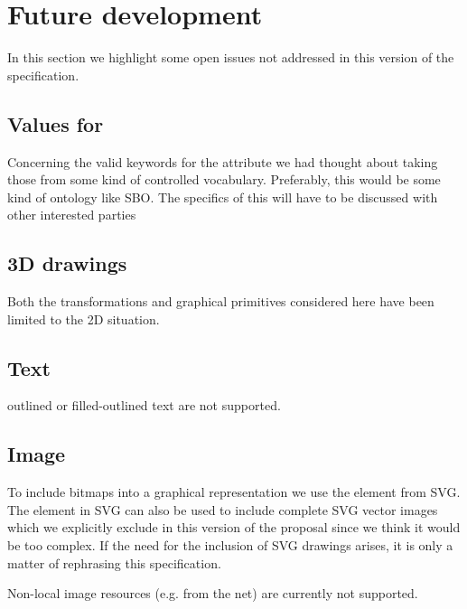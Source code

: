 
\section{Future development}
\label{future}

In this section we highlight some open issues not addressed in this version
of the \Render specification.



\subsection{Values for \StyleType}


Concerning the valid 
keywords for the  attribute we had thought about taking those 
from some kind of controlled vocabulary. Preferably, this would be some kind of 
ontology like SBO. The specifics of this will have to be discussed with other 
interested parties

\subsection{3D drawings}

Both the transformations and graphical primitives considered here have been limited to the 2D situation. 

\subsection{Text}

outlined or filled-outlined text are not supported.

\subsection{Image}

To include bitmaps into a graphical representation we use the \Image element 
from SVG. The \Image element in SVG can also be used to include complete SVG 
vector images which we explicitly exclude in this version of the proposal 
since we think it would be too complex. If the need for the inclusion of SVG 
drawings arises, it is only a matter of rephrasing this specification.


Non-local image resources (e.g. from the net) are currently not supported.